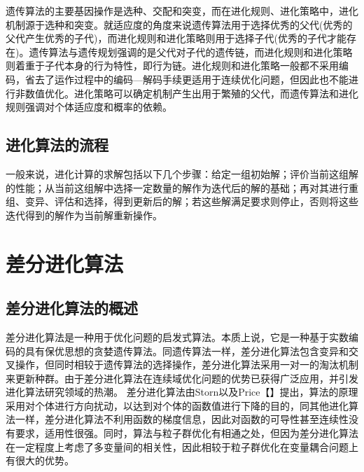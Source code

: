 \documentclass[12pt]{article}
\begin{document}
遗传算法的主要基因操作是选种、交配和突变，而在进化规则、进化策略中，进化机制源于选种和突变。就适应度的角度来说遗传算法用于选择优秀的父代(优秀的父代产生优秀的子代)，而进化规则和进化策略则用于选择子代(优秀的子代才能存在)。遗传算法与遗传规划强调的是父代对子代的遗传链，而进化规则和进化策略则着重于子代本身的行为特性，即行为链。进化规则和进化策略一般都不采用编码，省去了运作过程中的编码—解码手续更适用于连续优化问题，但因此也不能进行非数值优化。进化策略可以确定机制产生出用于繁殖的父代，而遗传算法和进化规则强调对个体适应度和概率的依赖。

\subsection{进化算法的流程}
一般来说，进化计算的求解包括以下几个步骤：给定一组初始解；评价当前这组解的性能；从当前这组解中选择一定数量的解作为迭代后的解的基础；再对其进行重组、变异、评估和选择，得到更新后的解；若这些解满足要求则停止，否则将这些迭代得到的解作为当前解重新操作。

\section{差分进化算法}
\subsection{差分进化算法的概述}
差分进化算法是一种用于优化问题的启发式算法。本质上说，它是一种基于实数编码的具有保优思想的贪婪遗传算法。同遗传算法一样，差分进化算法包含变异和交叉操作，但同时相较于遗传算法的选择操作，差分进化算法采用一对一的淘汰机制来更新种群。由于差分进化算法在连续域优化问题的优势已获得广泛应用，并引发进化算法研究领域的热潮。 差分进化算法由Storn以及Price【】提出，算法的原理采用对个体进行方向扰动，以达到对个体的函数值进行下降的目的，同其他进化算法一样，差分进化算法不利用函数的梯度信息，因此对函数的可导性甚至连续性没有要求，适用性很强。同时，算法与粒子群优化有相通之处，但因为差分进化算法在一定程度上考虑了多变量间的相关性，因此相较于粒子群优化在变量耦合问题上有很大的优势。
\end{document}
